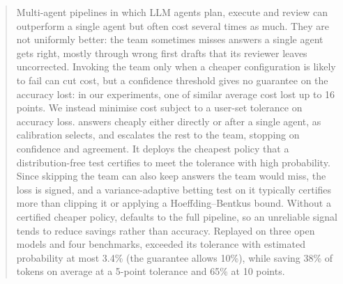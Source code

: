 \begin{abstract}
Multi-agent pipelines in which LLM agents plan, execute and review can outperform a single agent but often cost
several times as much. They are not uniformly better: the team sometimes misses answers a single agent gets right,
mostly through wrong first drafts that its reviewer leaves uncorrected. Invoking the team only when a cheaper
configuration is likely to fail can cut cost, but a confidence threshold gives no guarantee on the accuracy
lost: in our experiments, one of similar average cost lost up to 16 points. We instead minimise cost subject to a
user-set tolerance on accuracy loss. \climb{} answers cheaply either directly or after a single agent, as calibration
selects, and escalates the rest to the team, stopping on confidence and agreement. It deploys the
cheapest policy that a distribution-free test certifies to meet the tolerance with high probability. Since skipping the team can also keep answers the team
would miss, the loss is signed, and a variance-adaptive betting test on it typically certifies more than clipping it or
applying a Hoeffding--Bentkus bound. Without a certified cheaper policy, \climb{} defaults to the full pipeline,
so an unreliable signal tends to reduce savings rather than accuracy. Replayed on three open models and four
benchmarks, \climb{} exceeded its tolerance with estimated probability at most 3.4\% (the guarantee allows
10\%), while saving 38\% of tokens on average at a 5-point tolerance and 65\% at 10 points.
\end{abstract}
